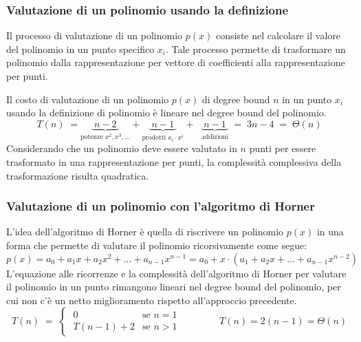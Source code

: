 \subsubsection*{Valutazione di un polinomio usando la definizione}
Il processo di valutazione di un polinomio \(p(x)\) consiste nel calcolare il valore del polinomio in un punto specifico
\(x_i\). Tale processo permette di trasformare un polinomio dalla rappresentazione per vettore di coefficienti alla
rappresentazione per punti.

Il costo di valutazione di un polinomio \(p(x)\) di degree bound \(n\) in un punto \(x_i\) usando la definizione di polinomio
è lineare nel degree bound del polinomio.
\[T(n) \; = \underbrace{\; n - 2 \;}_{\text{potenze \(x^2, x^3, ...\)}} + \underbrace{\; n - 1 \;}_{\text{prodotti \(a_i \cdot x^i\)}} + \;\;\underbrace{\; n - 1 \;}_{\text{addizioni}} \; = \; 3n - 4 \; = \; \Theta(n)\]
Considerando che un polinomio deve essere valutato in \(n\) punti per essere trasformato in una rappresentazione per punti,
la complessità complessiva della trasformazione risulta quadratica.

\subsubsection*{Valutazione di un polinomio con l'algoritmo di Horner}
L'idea dell'algoritmo di Horner è quella di riscrivere un polinomio \(p(x)\) in una forma che permette di valutare
il polinomio ricorsivamente come segue:
\[p(x) = a_0 + a_1 x + a_2 x^2 + \dots + a_{n-1} x^{n-1} = a_0 + x \cdot \left( a_1 + a_2 x + \dots + a_{n-1} x^{n-2} \right)\]
L'equazione alle ricorrenze e la complessità dell'algoritmo di Horner per valutare il polinomio in un punto rimangono lineari
nel degree bound del polinomio, per cui non c'è un netto miglioramento rispetto all'approccio precedente.
\[T(n) \; = \; \begin{cases}
	\; 0 & \text{se } n = 1 \\[3pt]
	\; T(n-1) + 2 & \text{se } n > 1
\end{cases} \qquad\qquad T(n) = 2(n-1) = \Theta(n)\]


